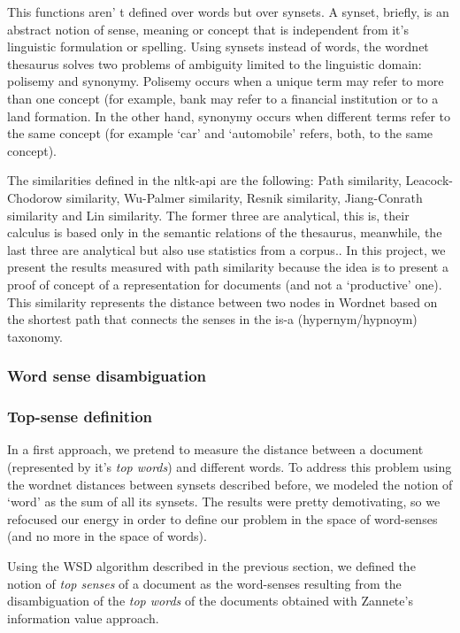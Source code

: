 \documentclass{pnastwo}
\newcommand\sq[1]{\textquoteleft #1\textquoteright}
\begin{document}
\begin{article}
This functions aren' t defined over words but over synsets. A synset, briefly, is an abstract notion of sense, meaning or concept that is independent from it's linguistic formulation or spelling. Using synsets instead of words, the wordnet thesaurus solves two problems of ambiguity limited to the linguistic domain: polisemy and synonymy. Polisemy occurs when a unique term may refer to more than one concept (for example, bank may refer to a financial institution or to a land formation. In the other hand, synonymy occurs when different terms refer to the same concept (for example \sq{car} and \sq{automobile} refers, both, to the same concept).

The similarities defined in the nltk-api are the following: Path similarity, Leacock-Chodorow similarity, Wu-Palmer similarity, Resnik similarity, Jiang-Conrath similarity and Lin similarity. The former three are analytical, this is, their calculus is based only in the semantic relations of the thesaurus, meanwhile, the last three are analytical but also use statistics from a corpus.\cite{BUDANITSKY}\cite{BUDANITSKY_2}. In this project, we present the results measured with path similarity because the idea is to present a proof of concept of a representation for documents (and not a `productive' one). This similarity represents the distance between two nodes in Wordnet based on the shortest path that connects the senses in the is-a (hypernym/hypnoym) taxonomy.


\subsubsection{Word sense disambiguation}

\subsubsection{Top-sense definition}

In a first approach, we pretend to measure the distance between a document (represented by it's \textit{top words}) and different words. To address this problem using the wordnet distances between synsets described before, we modeled the notion of \sq{word} as the sum of all its synsets. The results were pretty demotivating, so we refocused our energy in order to define our problem in the space of word-senses (and no more in the space of words). 

Using the WSD algorithm described in the previous section, we defined the notion of \textit{top senses} of a document as the word-senses resulting from the disambiguation of the \textit{top words} of the documents obtained with Zannete's information value approach.


\end{article}
\end{document}
